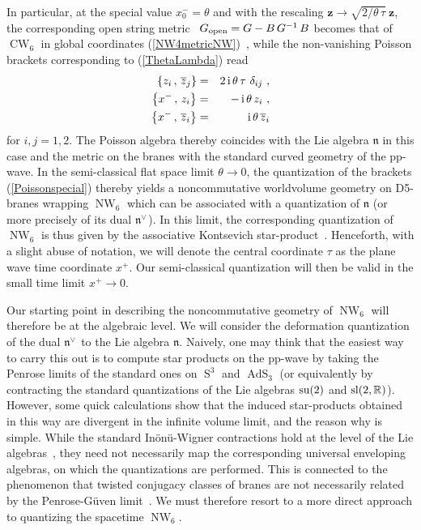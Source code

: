 \documentclass[11pt,a4paper]{article}
\DeclareMathOperator{\AdS}{AdS}
\DeclareMathOperator{\Sphere}{S}
\DeclareMathOperator{\NW}{NW}
\DeclareMathOperator{\CW}{CW}
\let\S\Sphere
\newcommand{\1}{\mathbb{1}}
\newcommand{\mbf}[1]{{\boldsymbol {#1} }}
\def\ii{{\,{\rm i}\,}}
\def\mz{{\mbf z}}
\newcommand{\real}{{\mathbb R}} %
\newcommand{\beq}{\begin{eqnarray}}
\newcommand{\eeq}{\end{eqnarray}}
\begin{document}
In particular, at the special value $x_0^-=\theta$ and with the
rescaling $\mz\to\sqrt{2/\theta\,\tau}~\mz$, the corresponding open
string metric~\cite{SW1} $G_{\rm open}=G-B\,G^{-1}\,B$ becomes that of
$\CW_6$ in global coordinates (\ref{NW4metricNW})~\cite{HSz1}, while
the non-vanishing Poisson brackets corresponding to
(\ref{ThetaLambda}) read
\beq
\left\{z_i\,,\,\overline{z}_j\right\}&=&2\ii\theta\,\tau~\delta_{ij} \ ,
\nonumber\\ \left\{x^-\,,\,z_i\right\}&=&-\ii\theta\,z_i \ ,
\nonumber\\ \left\{x^-\,,\,\overline{z}_i\right\}&=&\ii\theta\,
\overline{z}_i
\label{Poissonspecial}\eeq
for $i,j=1,2$. The Poisson algebra thereby coincides with the
Lie algebra $\mathfrak{n}$ in this case and the metric
on the branes with the standard curved geometry of the pp-wave. In the
semi-classical flat space limit $\theta\to0$, the
quantization of the brackets (\ref{Poissonspecial}) thereby yields a
noncommutative worldvolume geometry on D5-branes wrapping $\NW_6$
which can be associated with a quantization of $\mathfrak{n}$ (or
more precisely of its dual $\mathfrak{n}^{\vee\,}$). In this limit, the
corresponding quantization of $\NW_6$ is thus given by the associative
Kontsevich star-product~\cite{Kont1}. Henceforth, with a slight abuse
of notation, we will denote the central coordinate $\tau$ as the plane
wave time coordinate $x^+$. Our semi-classical quantization will then
be valid in the small time limit $x^+\to0$.

Our starting point in describing the noncommutative geometry of
$\NW_6$ will therefore be at the algebraic level. We will consider the
deformation quantization of the dual $\mathfrak{n}^{\vee\,}$ to the Lie
algebra $\mathfrak{n}$. Naively,
one may think that the easiest way to carry this out is to compute star
products on the pp-wave by taking the Penrose limits of the
standard ones on $\S^3$ and $\AdS_3$ (or equivalently by contracting
the standard quantizations of the Lie algebras ${\rm su}(2)$ and ${\rm
  sl}(2,\real)$). However, some quick calculations show that the
induced star-products obtained in this way are divergent in the
infinite volume limit, and the reason why is
simple. While the standard In\"on\"u-Wigner contractions hold at the
level of the Lie algebras~\cite{SF-OF1}, they need not necessarily map
the corresponding universal enveloping algebras, on
which the quantizations are performed. This is connected to the
phenomenon that twisted conjugacy classes of branes are not
necessarily related by the Penrose-G\"uven limit~\cite{HSz1}. We must
therefore resort to a more direct approach to quantizing the spacetime
$\NW_6$.
\end{document}
